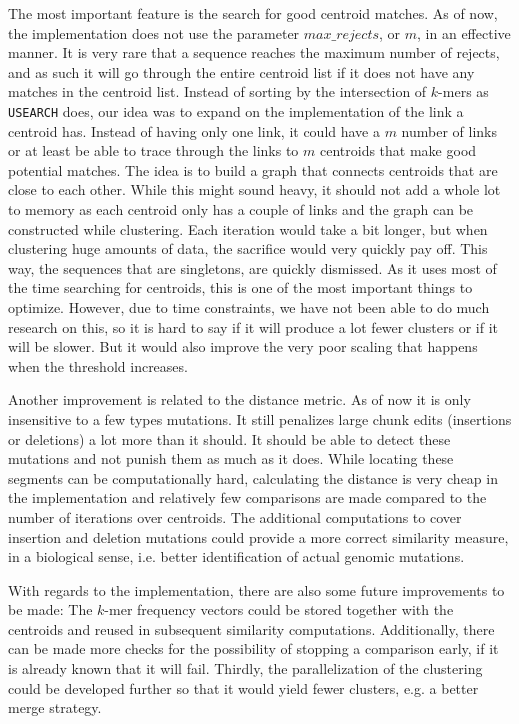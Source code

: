 The most important feature is the search for good centroid matches. As of now,
the implementation does not use the parameter $max\_rejects$, or $m$, in an
effective manner. It is very rare that a sequence reaches the maximum number
of rejects, and as such it will go through the entire centroid list if it does
not have any matches in the centroid list. Instead of sorting by the
intersection of $k$-mers as \texttt{USEARCH} does, our idea was to expand
on the implementation of the link a centroid has. Instead of having only one
link, it could have a $m$ number of links or at least be able to trace through
the links to $m$ centroids that make good potential matches. The idea is to
build a graph that connects centroids that are close to each other. While this
might sound heavy, it should not add a whole lot to memory as each centroid
only has a couple of links and the graph can be constructed while clustering.
Each iteration would take a bit longer, but when clustering huge amounts of
data, the sacrifice would very quickly pay off. This way, the sequences that
are singletons, are quickly dismissed. As it uses most of the time searching
for centroids, this is one of the most important things to optimize. However,
due to time constraints, we have not been able to do much research on this, so
it is hard to say if it will produce a lot fewer clusters or if it will be
slower. But it would also improve the very poor scaling that happens when the
threshold increases.

Another improvement is related to the distance metric. As of now it is only
insensitive to a few types mutations. It still penalizes large chunk edits
(insertions or deletions) a lot more than it should. It should be able to
detect these mutations and not punish them as much as it does. While locating
these segments can be computationally hard, calculating the distance is very
cheap in the implementation and relatively few comparisons are made compared to
the number of iterations over centroids. The additional computations to cover
insertion and deletion mutations could provide a more correct similarity
measure, in a biological sense, i.e. better identification of actual genomic
mutations.

With regards to the implementation, there are also some future improvements to
be made: The $k$-mer frequency vectors could be stored together with the
centroids and reused in subsequent similarity computations. Additionally, there
can be made more checks for the possibility of stopping a comparison early, if
it is already known that it will fail. Thirdly, the parallelization of the
clustering could be developed further so that it would yield fewer clusters,
e.g. a better merge strategy.
